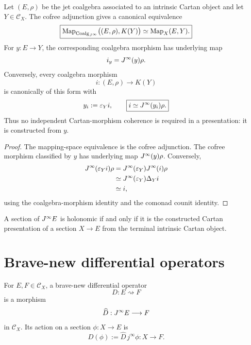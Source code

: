\begin{theorem}
\label{prop:cartan-cofree-factorization}
Let $(E,\rho)$ be the jet coalgebra associated to an intrinsic Cartan object and let $Y\in\mathcal C_X$.  The cofree adjunction gives a canonical equivalence
\[
\boxed{
    \operatorname{Map}_{\operatorname{Coalg}_{J^{\infty}}}
    \bigl((E,\rho),K(Y)\bigr)
    \simeq
    \operatorname{Map}_X(E,Y).
}
\]
For $y:E\to Y$, the corresponding coalgebra morphism has underlying map
\[
    i_y=J^{\infty}(y)\rho.
\]
Conversely, every coalgebra morphism
\[
    i:(E,\rho)\longrightarrow K(Y)
\]
is canonically of this form with
\[
    y_i:=\varepsilon_Yi,
    \qquad
    \boxed{i\simeq J^{\infty}(y_i)\rho.}
\]
Thus no independent Cartan-morphism coherence is required in a presentation: it is constructed from $y$.
\end{theorem}

\begin{proof}
The mapping-space equivalence is the cofree adjunction.  The cofree morphism classified by $y$ has underlying map $J^{\infty}(y)\rho$.  Conversely,
\[
\begin{aligned}
J^{\infty}(\varepsilon_Yi)\rho
&=
J^{\infty}(\varepsilon_Y)J^{\infty}(i)\rho\\
&\simeq
J^{\infty}(\varepsilon_Y)\Delta_Yi\\
&\simeq i,
\end{aligned}
\]
using the coalgebra-morphism identity and the comonad counit identity.
\end{proof}

\begin{corollary}
A section of $J^{\infty} E$ is holonomic if and only if it is the constructed Cartan presentation of a section $X\to E$ from the terminal intrinsic Cartan object.
\end{corollary}

\section{Brave-new differential operators}
\label{sec:differential-operators}
\label{sec:operator-prolongation}

\begin{definition}
\label{def:differential-operator}
For $E,F\in\mathcal C_X$, a brave-new differential operator
\[
    D:E\rightsquigarrow F
\]
is a morphism
\[
    \widehat D:J^{\infty} E\longrightarrow F
\]
in $\mathcal C_X$.  Its action on a section $\phi:X\to E$ is
\[
    D(\phi):=\widehat D\,j^\infty\phi:X\longrightarrow F.
\]
\end{definition}

